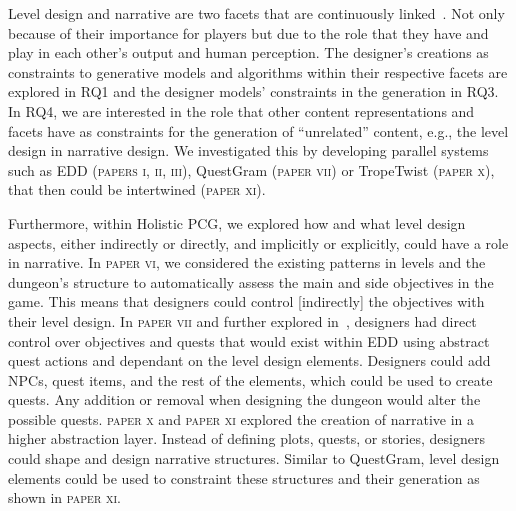 Level design and narrative are two facets that are continuously linked~\cite{kishino_hunt_2005,ashmore_quest_2007,kybartas_quinn_survey_2017}. Not only because of their importance for players but due to the role that they have and play in each other's output and human perception. The designer's creations as constraints to generative models and algorithms within their respective facets are explored in RQ1 and the designer models' constraints in the generation in RQ3. In RQ4, we are interested in the role that other content representations and facets have as constraints for the generation of ``unrelated'' content, e.g., the level design in narrative design. We investigated this by developing parallel systems such as EDD (\textsc{papers i, ii, iii}), QuestGram (\textsc{paper vii}) or TropeTwist (\textsc{paper x}), that then could be intertwined (\textsc{paper xi}). 

Furthermore, within Holistic PCG, we explored how and what level design aspects, either indirectly or directly, and implicitly or explicitly, could have a role in narrative. In \textsc{paper vi}, we considered the existing patterns in levels and the dungeon's structure to automatically assess the main and side objectives in the game. This means that designers could control [indirectly] the objectives with their level design. In \textsc{paper vii} and further explored in~\cite{larsson_queststories_2021}, designers had direct control over objectives and quests that would exist within EDD using abstract quest actions and dependant on the level design elements. Designers could add NPCs, quest items, and the rest of the elements, which could be used to create quests. Any addition or removal when designing the dungeon would alter the possible quests. \textsc{paper x} and \textsc{paper xi} explored the creation of narrative in a higher abstraction layer. Instead of defining plots, quests, or stories, designers could shape and design narrative structures. Similar to QuestGram, level design elements could be used to constraint these structures and their generation as shown in \textsc{paper xi}.







